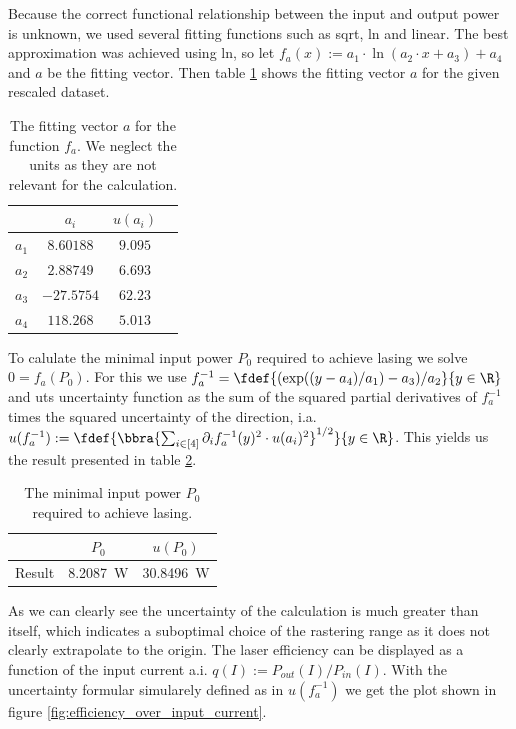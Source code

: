 \documentclass[../main.tex]{subfiles}
\begin{document}
    Because the correct functional relationship between the input and output power is unknown, we used several fitting functions such as sqrt, ln and linear. The best approximation was achieved using ln, so let $f_a(x) := a_1\cdot \ln(a_2\cdot x + a_3) + a_4$ and $a$ be the fitting vector. Then table \ref{tab:fitting_vector_logfit} shows the fitting vector $a$ for the given rescaled dataset. 
    \begin{table}[H]
        \centering
        \begin{tabular}{|c|c|c|c}
            \hline
             & $a_i$ & $u(a_i)$ \\
            \hline\hline
            $a_1$ & $8.60188$ & $9.095$ \\
            $a_2$ & $2.88749$ & $6.693$ \\
            $a_3$ & $-27.5754$ & $62.23$ \\
            $a_4$ & $118.268$ & $5.013$ \\
            \hline
        \end{tabular}
        \caption{The fitting vector $a$ for the function $f_a$. We neglect the units as they are not relevant for the calculation.}
        \label{tab:fitting_vector_logfit}
    \end{table}
    To calulate the minimal input power $P_0$ required to achieve lasing we solve $0 = f_a(P_0)$. For this we use $f_a^{-1}=\fdef{(\exp((y-a_4)/a_1)-a_3)/a_2}{y\in\R}$ and uts uncertainty function as the sum of the squared partial derivatives of $f_a^{-1}$ times the squared uncertainty of the direction, i.a. $u(f_a^{-1}):=\fdef{\bbra{\sum_{i\in[4]}\partial_if_a^{-1}(y)^2\cdot u(a_i)^2}^{1/2}}{y\in\R}$. This yields us the result presented in table \ref{tab:minimal_input_power}. 
    \begin{table}[H]
        \centering
        \begin{tabular}{|c|cc|}
            \hline
            & $P_0$ & $u(P_0)$ \\
            \hline\hline
            Result & \SI{8.2087}{\W} & \SI{30.8496}{\W} \\
            \hline
        \end{tabular}
        \caption{The minimal input power $P_0$ required to achieve lasing.}
        \label{tab:minimal_input_power}
    \end{table}
    As we can clearly see the uncertainty of the calculation is much greater than itself, which indicates a suboptimal choice of the rastering range as it does not clearly extrapolate to the origin. The laser efficiency can be displayed as a function of the input current a.i. $q(I) := P_{\textit{out}}(I)/P_{\textit{in}}(I)$. With the uncertainty formular simularely defined as in $u(f_a^{-1})$ we get the plot shown in figure \ref{fig:efficiency_over_input_current}. 
\end{document}

